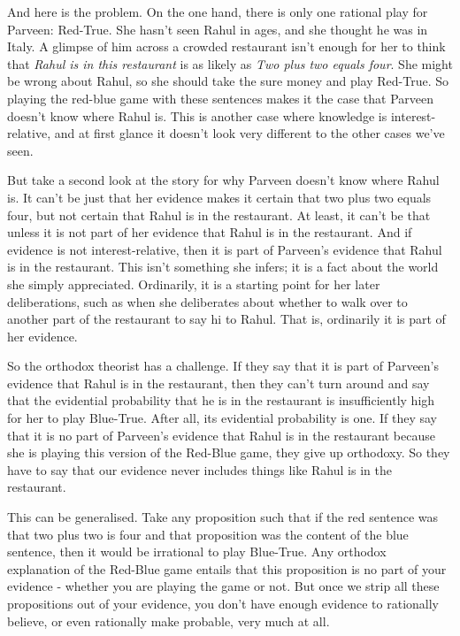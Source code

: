 \documentclass[
  11pt,
]{book}
\begin{document}
And here is the problem. On the one hand, there is only one rational play for Parveen: Red-True. She hasn't seen Rahul in ages, and she thought he was in Italy. A glimpse of him across a crowded restaurant isn't enough for her to think that \emph{Rahul is in this restaurant} is as likely as \emph{Two plus two equals four}. She might be wrong about Rahul, so she should take the sure money and play Red-True. So playing the red-blue game with these sentences makes it the case that Parveen doesn't know where Rahul is. This is another case where knowledge is interest-relative, and at first glance it doesn't look very different to the other cases we've seen.

But take a second look at the story for why Parveen doesn't know where Rahul is. It can't be just that her evidence makes it certain that two plus two equals four, but not certain that Rahul is in the restaurant. At least, it can't be that unless it is not part of her evidence that Rahul is in the restaurant. And if evidence is not interest-relative, then it is part of Parveen's evidence that Rahul is in the restaurant. This isn't something she infers; it is a fact about the world she simply appreciated. Ordinarily, it is a starting point for her later deliberations, such as when she deliberates about whether to walk over to another part of the restaurant to say hi to Rahul. That is, ordinarily it is part of her evidence.

So the orthodox theorist has a challenge. If they say that it is part of Parveen's evidence that Rahul is in the restaurant, then they can't turn around and say that the evidential probability that he is in the restaurant is insufficiently high for her to play Blue-True. After all, its evidential probability is one. If they say that it is no part of Parveen's evidence that Rahul is in the restaurant because she is playing this version of the Red-Blue game, they give up orthodoxy. So they have to say that our evidence never includes things like Rahul is in the restaurant.

This can be generalised. Take any proposition such that if the red sentence was that two plus two is four and that proposition was the content of the blue sentence, then it would be irrational to play Blue-True. Any orthodox explanation of the Red-Blue game entails that this proposition is no part of your evidence - whether you are playing the game or not. But once we strip all these propositions out of your evidence, you don't have enough evidence to rationally believe, or even rationally make probable, very much at all.
\end{document}
